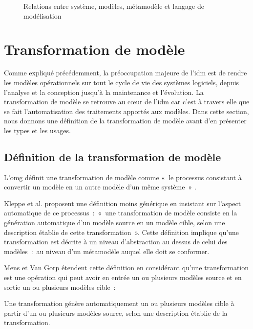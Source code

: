 \begin{figure}[!htbp]
 \begin{center}
 
 \end{center}
 \caption{Relations entre système, modèles, métamodèle et langage de 
modélisation \protect\cite{favre2006ingenierie}}
 \label{fig:carteFavre}
\end{figure}

\section{Transformation de modèle}
Comme expliqué précédemment, la préoccupation majeure de l'\gls{idm} est de 
rendre les modèles opérationnels sur tout le cycle de vie des systèmes 
logiciels, depuis l'analyse et la conception jusqu'à la maintenance et 
l'évolution. La transformation de modèle se retrouve au cœur de l'\gls{idm} car 
c'est à travers elle que se fait l'automatisation des traitements apportés aux 
modèles. Dans cette section, nous donnons une définition de la 
transformation de modèle avant d'en présenter les types et les usages.

\subsection{Définition de la transformation de modèle}
L'\gls{omg} définit une transformation de modèle comme «~le processus consistant à 
convertir un modèle en un autre modèle d'un même système~» \cite{omg2011meta}. 

Kleppe et al. \cite{kleppe2003mda} proposent une définition moins générique en insistant sur l'aspect automatique de ce processus~:~«~une transformation de modèle 
consiste en la génération automatique d'un modèle source en un modèle cible, 
selon une description établie de cette transformation~». Cette définition 
implique qu'une transformation est décrite à un niveau 
d'abstraction au dessus de celui des modèles~:~au niveau d'un métamodèle auquel elle doit se conformer. 

Mens et Van Gorp \cite{mens2006taxonomy} étendent cette définition en considérant qu'une 
transformation est une opération qui peut avoir en entrée un ou plusieurs 
modèles source et en sortie un ou plusieurs modèles cible~: 

\begin{definition}
Une transformation génère automatiquement un ou plusieurs modèles cible à partir 
d'un ou plusieurs modèles source, selon une description établie de la 
transformation. 
\end{definition}

